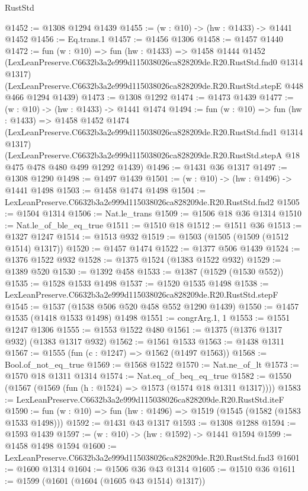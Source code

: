 \begin{lexlean}{RustStd}
\begin{coremodule}
@1452 := @1308 @1294 @1439
@1455 := (w : @10) -> (hw : @1433) -> @1441 @1452
@1456 := Eq.trans.{1}
@1457 := @1456 @1306
@1458 := @1457 @1440
@1472 := fun (w : @10) =>
  fun (hw : @1433) =>
  @1458
    @1444
    @1452
    (LexLeanPreserve.C6632b3a2e999d115038026ca828209de.R20.RustStd.fnd0 @1314 @1317)
    (LexLeanPreserve.C6632b3a2e999d115038026ca828209de.R20.RustStd.stepE @448 @466 @1294 @1439)
@1473 := @1308 @1292
@1474 := @1473 @1439
@1477 := (w : @10) -> (hw : @1433) -> @1441 @1474
@1494 := fun (w : @10) =>
  fun (hw : @1433) =>
  @1458
    @1452
    @1474
    (LexLeanPreserve.C6632b3a2e999d115038026ca828209de.R20.RustStd.fnd1 @1314 @1317)
    (LexLeanPreserve.C6632b3a2e999d115038026ca828209de.R20.RustStd.stepA
      @18
      @475
      @478
      @480
      @499
      @1292
      @1439)
@1496 := @1431 @36 @1317
@1497 := @1308 @1290
@1498 := @1497 @1439
@1501 := (w : @10) -> (hw : @1496) -> @1441 @1498
@1503 := @1458 @1474 @1498
@1504 := LexLeanPreserve.C6632b3a2e999d115038026ca828209de.R20.RustStd.fnd2
@1505 := @1504 @1314
@1506 := Nat.le_trans
@1509 := @1506 @18 @36 @1314
@1510 := Nat.le_of_ble_eq_true
@1511 := @1510 @18
@1512 := @1511 @36
@1513 := @1327 @1247
@1514 := @1513 @932
@1519 := @1503 (@1505 (@1509 (@1512 @1514) @1317))
@1520 := @1457 @1474
@1522 := @1377 @506 @1439
@1524 := @1376 @1522 @932
@1528 := @1375 @1524 (@1383 @1522 @932)
@1529 := @1389 @520
@1530 := @1392 @458
@1533 := @1387 (@1529 (@1530 @552))
@1535 := @1528 @1533 @1498
@1537 := @1520 @1535 @1498
@1538 := LexLeanPreserve.C6632b3a2e999d115038026ca828209de.R20.RustStd.stepF
@1545 := @1537 (@1538 @506 @520 @458 @552 @1290 @1439)
@1550 := @1457 @1535 (@1418 @1533 @1498) @1498
@1551 := congrArg.{1, 1}
@1553 := @1551 @1247 @1306
@1555 := @1553 @1522 @480
@1561 := @1375 (@1376 @1317 @932) (@1383 @1317 @932)
@1562 := @1561 @1533
@1563 := @1438 @1311
@1567 := @1555 (fun (c : @1247) => @1562 (@1497 @1563))
@1568 := Bool.of_not_eq_true
@1569 := @1568 @1522
@1570 := Nat.ne_of_lt
@1573 := @1570 @18 @1311 @1314
@1574 := Nat.eq_of_beq_eq_true
@1582 := @1550 (@1567 (@1569 (fun (h : @1524) => @1573 (@1574 @18 @1311 @1317))))
@1583 := LexLeanPreserve.C6632b3a2e999d115038026ca828209de.R20.RustStd.iteF
@1590 := fun (w : @10) => fun (hw : @1496) => @1519 (@1545 (@1582 (@1583 @1533 @1498)))
@1592 := @1431 @43 @1317
@1593 := @1308 @1288
@1594 := @1593 @1439
@1597 := (w : @10) -> (hw : @1592) -> @1441 @1594
@1599 := @1458 @1498 @1594
@1600 := LexLeanPreserve.C6632b3a2e999d115038026ca828209de.R20.RustStd.fnd3
@1601 := @1600 @1314
@1604 := @1506 @36 @43 @1314
@1605 := @1510 @36
@1611 := @1599 (@1601 (@1604 (@1605 @43 @1514) @1317))

\end{coremodule}
\end{lexlean}

